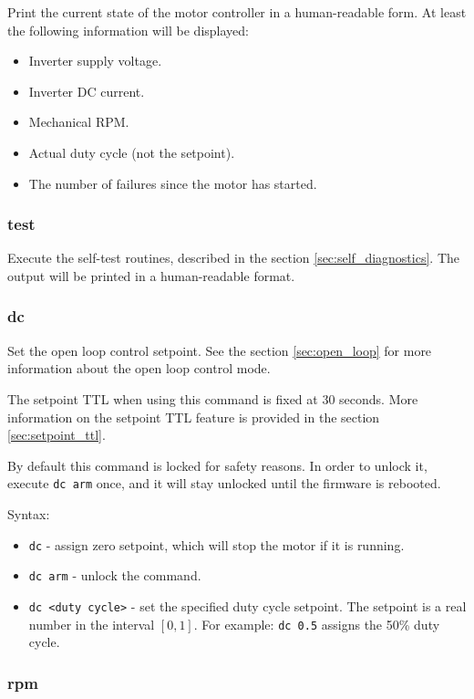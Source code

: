 \documentclass{zubaxdoc}
\begin{document}
Print the current state of the motor controller in a human-readable form.
At least the following information will be displayed:
\begin{itemize}
\item Inverter supply voltage.
\item Inverter DC current.
\item Mechanical RPM.
\item Actual duty cycle (not the setpoint).
\item The number of failures since the motor has started.
\end{itemize}

\subsubsection{test}

Execute the self-test routines, described in the section \ref{sec:self_diagnostics}.
The output will be printed in a human-readable format.

\subsubsection{dc}

Set the open loop control setpoint.
See the section \ref{sec:open_loop} for more information about the open loop control mode.

The setpoint TTL when using this command is fixed at 30 seconds.
More information on the setpoint TTL feature is provided in the section \ref{sec:setpoint_ttl}.

By default this command is locked for safety reasons.
In order to unlock it, execute \verb|dc arm| once, and it will stay unlocked until the firmware is rebooted.

Syntax:
\begin{itemize}
\item \verb|dc| - assign zero setpoint, which will stop the motor if it is running.
\item \verb|dc arm| - unlock the command.
\item \verb|dc <duty cycle>| - set the specified duty cycle setpoint.
The setpoint is a real number in the interval $\left[0, 1\right]$.
For example: \verb|dc 0.5| assigns the 50\% duty cycle.
\end{itemize}

\subsubsection{rpm}
\end{document}
